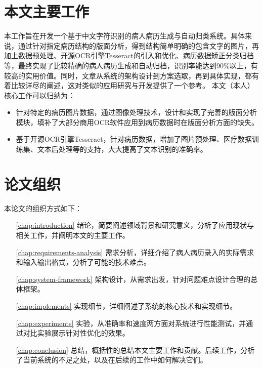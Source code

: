 \section{本文主要工作}
本工作旨在开发一个基于中文字符识别的病人病历生成与自动归类系统。具体来说，通过针对指定病历结构的版面分析，得到结构简单明确的包含文字的图片，再加上数据预处理、开源OCR引擎Tesseract的引入和优化、病历数据矫正分类归档等，最终实现了比较精确的病人病历生成和自动归档，识别率能达到90\%以上，有较高的实用价值。同时，文章从系统的架构设计到方案选取，再到具体实现，都有着比较详尽的阐述，这对类似的应用研究与开发提供了一个参考。
本文（本人）核心工作可以归纳为：
\begin{itemize}
  \item 针对特定的病历图片数据，通过图像处理技术，设计和实现了完善的版面分析模块，填补了大部分商用OCR软件应用到病历数据时在版面分析方面的缺失。
  \item 基于开源OCR引擎Tesseract，针对病历数据，增加了图片预处理、医疗数据训练集、文本后处理等的支持，大大提高了文本识别的准确率。
\end{itemize}

\section{论文组织}
本论文的组织方式如下：
\begin{itemize}
	\item[\autoref{chap:introduction}]
	绪论，简要阐述领域背景和研究意义，分析了应用现状与相关工作，并阐明本文的主要工作。
	\item[\autoref{chap:requirements-analysis}] 需求分析，详细介绍了病人病历录入的实际需求和输入输出格式，分析了可能的技术难点。
	\item[\autoref{chap:system-framework}]
	架构设计，从需求出发，针对问题难点设计合理的总体框架。
	\item[\autoref{chap:implements}]
	实现细节，详细阐述了系统的核心技术和实现细节。
	\item[\autoref{chap:experiments}]
	实验，从准确率和速度两方面对系统进行性能测试，并通过对比实验展示针对性优化的效果。
	\item[\autoref{chap:conclusion}]
	总结，概括性的总结本文主要工作和贡献。后续工作，分析了当前系统的不足之处，以及在后续的工作中如何解决它们。
\end{itemize}
